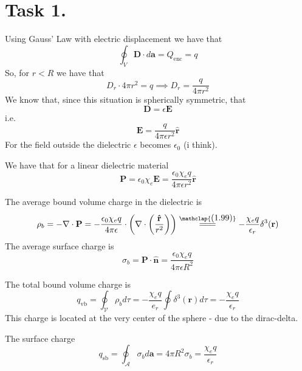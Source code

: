 \documentclass[a4paper,11pt]{article}
\begin{document}


\section*{Task 1.}
\begin{alphalist}
    \item Using Gauss' Law with electric displacement we have that 
        \[
            \oint_{V} \mathbf{D} \cdot d\mathbf{a} = Q_{\text{enc}} = q
        \]
        So, for $r < R$ we have that
        \[
            D_{r} \cdot 4\pi r^2 = q \implies D_r = \frac{q}{4\pi r^2}
        \]
        We know that, since this situation is spherically symmetric, that
        \[
            \mathbf{D} = \epsilon \mathbf{E}
        \]
        i.e.
        \[
            \mathbf{E} = \frac{q}{4\pi \epsilon r^2}\mathbf{\hat{r}}
        \]
        For the field outside the dielectric $\epsilon$ becomes $\epsilon_0$ (i think).
    \item We have that for a linear dielectric material
        \[
            \mathbf{P} = \epsilon_0 \chi_e \mathbf{E} = \frac{\epsilon_0 \chi_e q}{4\pi \epsilon r^2}\mathbf{\hat{r}}
        \]
    \item The average bound volume charge in the dielectric is
        \[
            \rho_b = - \nabla \cdot \mathbf{P} = - \frac{\epsilon_0 \chi_e q}{4\pi \epsilon} \cdot \left(\nabla \cdot \left(\frac{\mathbf{\hat{r}}}{r^2}\right)\right) \stackrel{\mathclap{\normalfont\mbox{(1.99)}}}{=\joinrel=\joinrel=} -\frac{\chi_e q}{\epsilon_r} \delta^3(\mathbf{r})
        \]
        The average surface charge is 
        \[
            \sigma_b = \mathbf{P} \cdot \mathbf{\hat{n}} = \frac{\epsilon_0 \chi_e q}{4\pi \epsilon R^2}
        \]
    \item The total bound volume charge is
        \[
            q_{\text{vb}} = \oint_{\mathcal{V}} \rho_b d\tau = -\frac{\chi_e q}{e_r} \oint \delta^3(\mathbf{r}) d\tau = -\frac{\chi_e q}{\epsilon_r}
        \]
        This charge is located at the very center of the sphere - due to the dirac-delta.

        The surface charge 
        \[
            q_{\text{sb}} = \oint_{\mathcal{A}} \sigma_b d\mathbf{a} = 4\pi R^2 \sigma_b = \frac{\chi_e q}{\epsilon_r}
        \]
\end{alphalist}
\end{document}
